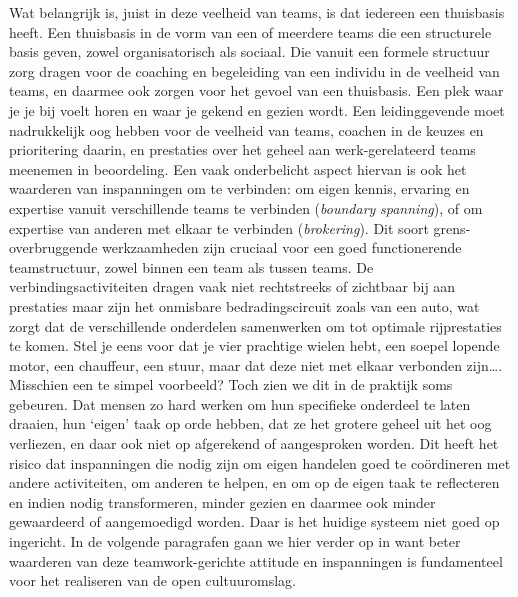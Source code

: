 \documentclass[smallauthor, chapterhaspagenum, nochapterinheader, pagenuminheader,  bigchapnum,medium2, tocpages, garamond, titleinheader]{jote-book}
\begin{document}
	Wat belangrijk is, juist in deze veelheid van teams, is dat iedereen een thuisbasis heeft. Een thuisbasis in de vorm van een of meerdere teams die een structurele basis geven, zowel organisatorisch als sociaal. Die vanuit een formele structuur zorg dragen voor de coaching en begeleiding van een individu in de veelheid van teams, en daarmee ook zorgen voor het gevoel van een thuisbasis. Een plek waar je je bij voelt horen en waar je gekend en gezien wordt. Een leidinggevende moet nadrukkelijk oog hebben voor de veelheid van teams, coachen in de keuzes en prioritering daarin, en prestaties over het geheel aan werk-gerelateerd teams meenemen in beoordeling. Een vaak onderbelicht aspect hiervan is ook het waarderen van inspanningen om te verbinden: om eigen kennis, ervaring en expertise vanuit verschillende teams te verbinden (\emph{boundary}\emph{ }\emph{spanning}), of om expertise van anderen met elkaar te verbinden (\emph{brokering}). Dit soort grens-overbruggende werkzaamheden zijn cruciaal voor een goed functionerende teamstructuur, zowel binnen een team als tussen teams. De verbindingsactiviteiten dragen vaak niet rechtstreeks of zichtbaar bij aan prestaties maar zijn het onmisbare bedradingscircuit zoals van een auto, wat zorgt dat de verschillende onderdelen samenwerken om tot optimale rijprestaties te komen. Stel je eens voor dat je vier prachtige wielen hebt, een soepel lopende motor, een chauffeur, een stuur, maar dat deze niet met elkaar verbonden zijn…. Misschien een te simpel voorbeeld? Toch zien we dit in de praktijk soms gebeuren. Dat mensen zo hard werken om hun specifieke onderdeel te laten draaien, hun ‘eigen' taak op orde hebben, dat ze het grotere geheel uit het oog verliezen, en daar ook niet op afgerekend of aangesproken worden. Dit heeft het risico dat inspanningen die nodig zijn om eigen handelen goed te coördineren met andere activiteiten, om anderen te helpen, en om op de eigen taak te reflecteren en indien nodig transformeren, minder gezien en daarmee ook minder gewaardeerd of aangemoedigd worden. Daar is het huidige systeem niet goed op ingericht. In de volgende paragrafen gaan we hier verder op in want beter waarderen van deze teamwork-gerichte attitude en inspanningen is fundamenteel voor het realiseren van de open cultuuromslag.
\end{document}
